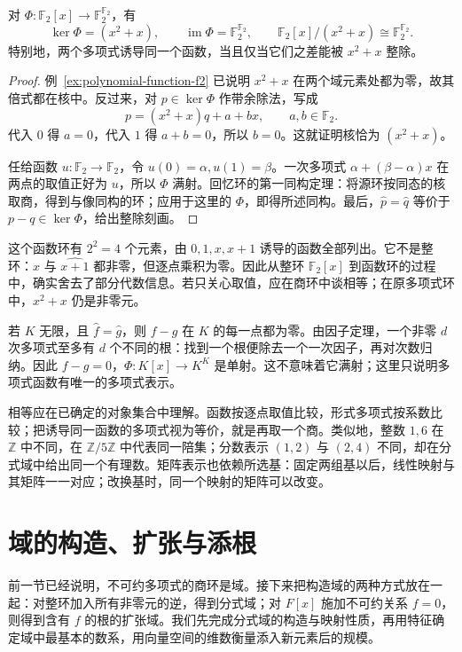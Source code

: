 \documentclass[lang=cn,a4paper,fontset=none,zihao=false,10pt,openany,twoside]{beautybook}
\numberwithin{algorithm}{chapter}
\begin{document}
\begin{proposition}[按取值相同取商]\label{prop:f2-polynomial-functions}
对 $\Phi:\mathbb F_2[x]\to\mathbb F_2^{\mathbb F_2}$，有
\[
 \ker\Phi=(x^2+x),\qquad
 \operatorname{im}\Phi=\mathbb F_2^{\mathbb F_2},\qquad
 \mathbb F_2[x]/(x^2+x)\cong\mathbb F_2^{\mathbb F_2}.
\]
特别地，两个多项式诱导同一个函数，当且仅当它们之差能被 $x^2+x$ 整除。
\end{proposition}
\begin{proof}
例~\ref{ex:polynomial-function-f2} 已说明 $x^2+x$ 在两个域元素处都为零，故其倍式都在核中。反过来，对 $p\in\ker\Phi$ 作带余除法，写成
\[
 p=(x^2+x)q+a+bx,\qquad a,b\in\mathbb F_2.
\]
代入 $0$ 得 $a=0$，代入 $1$ 得 $a+b=0$，所以 $b=0$。这就证明核恰为 $(x^2+x)$。

任给函数 $u:\mathbb F_2\to\mathbb F_2$，令 $u(0)=\alpha,u(1)=\beta$。一次多项式 $\alpha+(\beta-\alpha)x$ 在两点的取值正好为 $u$，所以 $\Phi$ 满射。回忆环的第一同构定理：将源环按同态的核取商，得到与像同构的环；应用于这里的 $\Phi$，即得所述同构。最后，$\widehat p=\widehat q$ 等价于 $p-q\in\ker\Phi$，给出整除刻画。
\end{proof}
这个函数环有 $2^2=4$ 个元素，由 $0,1,x,x+1$ 诱导的函数全部列出。它不是整环：$\widehat x$ 与 $\widehat{x+1}$ 都非零，但逐点乘积为零。因此从整环 $\mathbb F_2[x]$ 到函数环的过程中，确实舍去了部分代数信息。若只关心取值，应在商环中谈相等；在原多项式环中，$x^2+x$ 仍是非零元。

\begin{remark}[无限域上可以由全部取值恢复多项式]
若 $K$ 无限，且 $\widehat f=\widehat g$，则 $f-g$ 在 $K$ 的每一点都为零。由因子定理，一个非零 $d$ 次多项式至多有 $d$ 个不同的根：找到一个根便除去一个一次因子，再对次数归纳。因此 $f-g=0$，$\Phi:K[x]\to K^K$ 是单射。这不意味着它满射；这里只说明多项式函数有唯一的多项式表示。

相等应在已确定的对象集合中理解。函数按逐点取值比较，形式多项式按系数比较；把诱导同一函数的多项式视为等价，就是再取一个商。类似地，整数 $1,6$ 在 $\mathbb Z$ 中不同，在 $\mathbb Z/5\mathbb Z$ 中代表同一陪集；分数表示 $(1,2)$ 与 $(2,4)$ 不同，却在分式域中给出同一个有理数。矩阵表示也依赖所选基：固定两组基以后，线性映射与其矩阵一一对应；改换基时，同一个映射的矩阵可以改变。
\end{remark}


\section{域的构造、扩张与添根}\label{sec:extensions-route}
前一节已经说明，不可约多项式的商环是域。接下来把构造域的两种方式放在一起：对整环加入所有非零元的逆，得到分式域；对 $F[x]$ 施加不可约关系 $f=0$，则得到含有 $f$ 的根的扩张域。我们先完成分式域的构造与映射性质，再用特征确定域中最基本的数系，用向量空间的维数衡量添入新元素后的规模。
\end{document}
